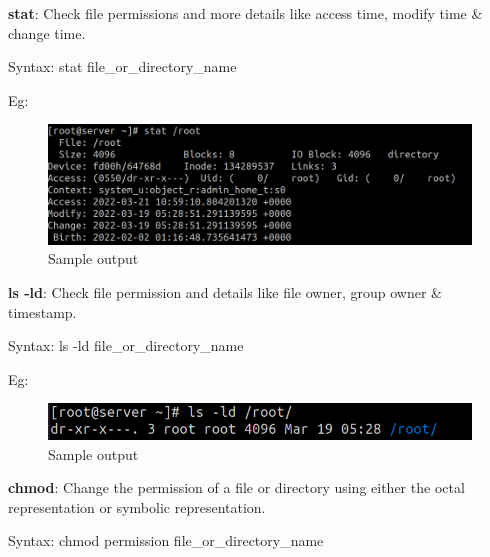 \setlength{\columnsep}{3pt}
\begin{flushleft}
	\bigskip
	\textbf{stat}: Check file permissions and more details like access time, modify time \& change time.
	\bigskip
	\begin{tcolorbox}[breakable,notitle,boxrule=0pt,colback=pink,colframe=pink]
		\color{black}
		\font=9pt
		Syntax: stat  file\_or\_directory\_name
		\font=4pt
	\end{tcolorbox}
	
	Eg:
	\begin{figure}[h!]
		\centering
		\includegraphics[scale=0.4]{content/chapter5/images/stat.png}
		\caption{Sample output}
		\label{fig:sample2}
	\end{figure}
	
	\textbf{ls -ld}: Check file permission and details like file owner, group owner \& timestamp.
	\bigskip
	\begin{tcolorbox}[breakable,notitle,boxrule=0pt,colback=pink,colframe=pink]
		\color{black}
		\font=9pt
		Syntax: ls -ld  file\_or\_directory\_name
		\font=4pt
	\end{tcolorbox}
	
	Eg:
	\begin{figure}[h!]
		\centering
		\includegraphics[scale=0.6]{content/chapter5/images/ls.png}
		\caption{Sample output}
		\label{fig:sample3}
	\end{figure}
	
	
	\newpage
	
	
	\textbf{chmod}: Change the permission of a file or directory using either the octal representation 
	or symbolic representation.
	\bigskip
	\begin{tcolorbox}[breakable,notitle,boxrule=0pt,colback=pink,colframe=pink]
		\color{black}
		\font=9pt
		Syntax: chmod  permission  file\_or\_directory\_name
		\font=4pt
	\end{tcolorbox}
	

\end{flushleft}
